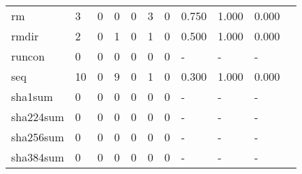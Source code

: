 \begin{longtable}{lp{1.10cm}p{1.10cm}p{1.10cm}p{1.10cm}p{1.10cm}p{1.10cm}p{1.10cm}p{1.10cm}p{1.10cm}p{1.10cm}}
rm        &                      3 &                                  0 &                                 0 &                                0 &                                 3 &                               0 &                          0.750 &                                 1.000 &                               0.000 \\
rmdir     &                      2 &                                  0 &                                 1 &                                0 &                                 1 &                               0 &                          0.500 &                                 1.000 &                               0.000 \\
runcon    &                      0 &                                  0 &                                 0 &                                0 &                                 0 &                               0 &                              - &                                     - &                                   - \\
seq       &                     10 &                                  0 &                                 9 &                                0 &                                 1 &                               0 &                          0.300 &                                 1.000 &                               0.000 \\
sha1sum   &                      0 &                                  0 &                                 0 &                                0 &                                 0 &                               0 &                              - &                                     - &                                   - \\
sha224sum &                      0 &                                  0 &                                 0 &                                0 &                                 0 &                               0 &                              - &                                     - &                                   - \\
sha256sum &                      0 &                                  0 &                                 0 &                                0 &                                 0 &                               0 &                              - &                                     - &                                   - \\
sha384sum &                      0 &                                  0 &                                 0 &                                0 &                                 0 &                               0 &                              - &                                     - &                                   - \\

\end{longtable}
